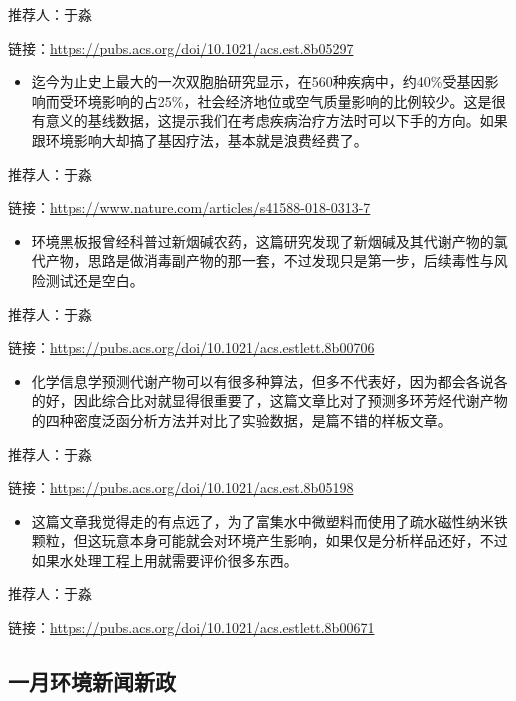\documentclass[]{book}
\providecommand{\tightlist}{%
  \setlength{\itemsep}{0pt}\setlength{\parskip}{0pt}}
\begin{document}
推荐人：于淼

链接：\url{https://pubs.acs.org/doi/10.1021/acs.est.8b05297}

\begin{itemize}
\tightlist
\item
  迄今为止史上最大的一次双胞胎研究显示，在560种疾病中，约40\%受基因影响而受环境影响的占25\%，社会经济地位或空气质量影响的比例较少。这是很有意义的基线数据，这提示我们在考虑疾病治疗方法时可以下手的方向。如果跟环境影响大却搞了基因疗法，基本就是浪费经费了。
\end{itemize}

推荐人：于淼

链接：\url{https://www.nature.com/articles/s41588-018-0313-7}

\begin{itemize}
\tightlist
\item
  环境黑板报曾经科普过新烟碱农药，这篇研究发现了新烟碱及其代谢产物的氯代产物，思路是做消毒副产物的那一套，不过发现只是第一步，后续毒性与风险测试还是空白。
\end{itemize}

推荐人：于淼

链接：\url{https://pubs.acs.org/doi/10.1021/acs.estlett.8b00706}

\begin{itemize}
\tightlist
\item
  化学信息学预测代谢产物可以有很多种算法，但多不代表好，因为都会各说各的好，因此综合比对就显得很重要了，这篇文章比对了预测多环芳烃代谢产物的四种密度泛函分析方法并对比了实验数据，是篇不错的样板文章。
\end{itemize}

推荐人：于淼

链接：\url{https://pubs.acs.org/doi/10.1021/acs.est.8b05198}

\begin{itemize}
\tightlist
\item
  这篇文章我觉得走的有点远了，为了富集水中微塑料而使用了疏水磁性纳米铁颗粒，但这玩意本身可能就会对环境产生影响，如果仅是分析样品还好，不过如果水处理工程上用就需要评价很多东西。
\end{itemize}

推荐人：于淼

链接：\url{https://pubs.acs.org/doi/10.1021/acs.estlett.8b00671}

\hypertarget{ux4e00ux6708ux73afux5883ux65b0ux95fbux65b0ux653f}{%
\subsection*{一月环境新闻新政}\label{ux4e00ux6708ux73afux5883ux65b0ux95fbux65b0ux653f}}
\end{document}
